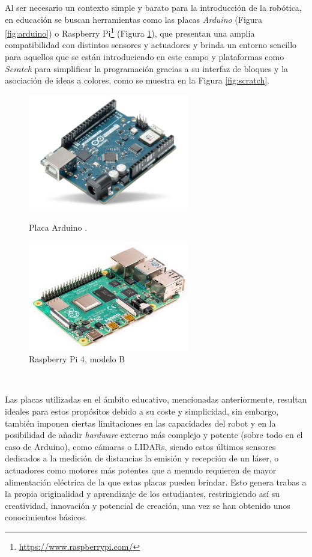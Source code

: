 Al ser necesario un contexto simple y barato para la introducción de la
robótica, en educación se buscan herramientas como las placas \textit{Arduino}
(Figura \ref{fig:arduino}) o Raspberry Pi\footnote{
\url{https://www.raspberrypi.com/}} (Figura \ref{fig:raspberry_pi}), que
presentan una amplia compatibilidad con distintos sensores y actuadores y brinda
un entorno sencillo para aquellos que se están introduciendo en este campo y
plataformas como \textit{Scratch} para simplificar la programación gracias a su
interfaz de bloques y la asociación de ideas a colores, como se muestra en la
Figura \ref{fig:scratch}.

\begin{figure}[h!]
  \centering
  \begin{minipage}{0.45\textwidth}
    \centering
    \includegraphics[width=7cm]{figs/arduino}
    \caption{Placa Arduino \citep{arduino_uno}.}
    \label{fig:arduino}
  \end{minipage}
  \hfill
  \begin{minipage}{0.45\textwidth}
    \centering
    \includegraphics[width=7cm]{figs/raspberry_pi_4b}
    \caption{Raspberry Pi 4, modelo B \citep{raspberry_pi_4b}}
    \label{fig:raspberry_pi}
  \end{minipage}
\end{figure}\

Las placas utilizadas en el ámbito educativo, mencionadas anteriormente,
resultan ideales para estos propósitos debido a su coste y simplicidad, sin
embargo, también imponen ciertas limitaciones en las capacidades del robot y en
la posibilidad de añadir \textit{hardware} externo más complejo y potente (sobre
todo en el caso de Arduino), como cámaras o LIDARs, siendo estos últimos
sensores dedicados a la medición de distancias la emisión y recepción de un
láser, o actuadores como motores más potentes que a menudo requieren de mayor
alimentación eléctrica de la que estas placas pueden brindar.
Esto genera trabas a la propia originalidad y aprendizaje de los estudiantes,
restringiendo así su creatividad, innovación y potencial de creación, una vez se
han obtenido unos conocimientos básicos.

